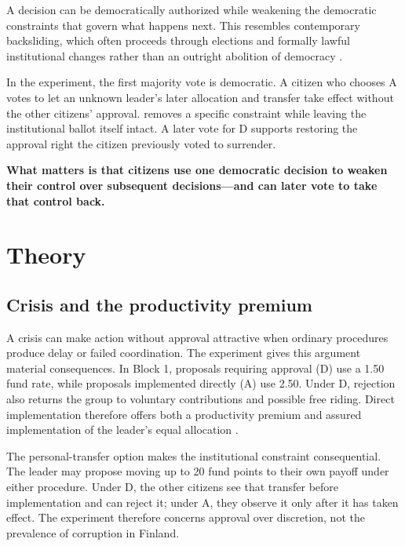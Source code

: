 \documentclass[11pt,a4paper]{article}
\newcommand{\Dproc}{\textsf{D}}
\newcommand{\Aproc}{\textsf{A}}
\begin{document}
\begin{keyinsightbox}
A decision can be democratically authorized while weakening the democratic constraints that govern what happens next. This resembles contemporary backsliding, which often proceeds through elections and formally lawful institutional changes rather than an outright abolition of democracy \parencite{Bermeo2016}.

In the experiment, the first majority vote is democratic. A citizen who chooses \Aproc{} votes to let an unknown leader's later allocation and transfer take effect without the other citizens' approval.  removes a specific constraint while leaving the institutional ballot itself intact. A later vote for \Dproc{} supports restoring the approval right the citizen previously voted to surrender.

\medskip
\textbf{What matters is that citizens use one democratic decision to weaken their control over subsequent decisions---and can later vote to take that control back.}
\end{keyinsightbox}


\section{Theory}

\subsection{Crisis and the productivity premium}

A crisis can make action without approval attractive when ordinary procedures produce delay or failed coordination. The experiment gives this argument material consequences. In Block 1, proposals requiring approval (\Dproc) use a 1.50 fund rate, while proposals implemented directly (\Aproc) use 2.50. Under \Dproc{}, rejection also returns the group to voluntary contributions and possible free riding. Direct implementation therefore offers both a productivity premium and assured implementation of the leader's equal allocation \parencites{FehrGachter2000,FischbacherGachter2010,Hamman2011}.

The personal-transfer option makes the institutional constraint consequential. The leader may propose moving up to 20 fund points to their own payoff under either procedure. Under \Dproc{}, the other citizens see that transfer before implementation and can reject it; under \Aproc{}, they observe it only after it has taken effect. The experiment therefore concerns approval over discretion, not the prevalence of corruption in Finland.
\end{document}
